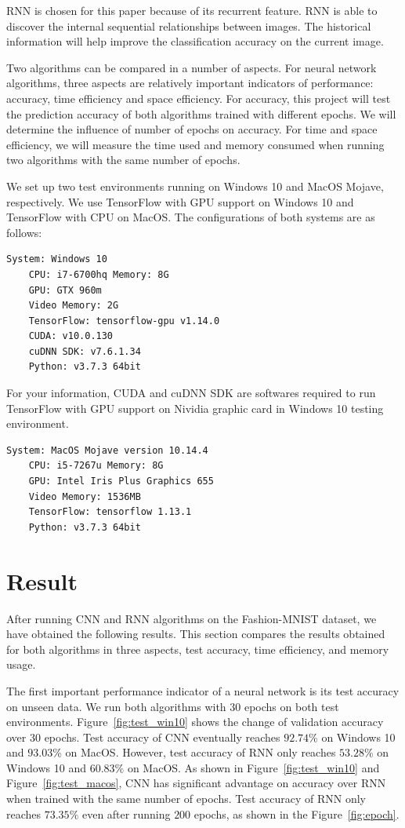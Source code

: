 \documentclass[letterpaper]{article} %
\begin{document}
	RNN is chosen for this paper because of its recurrent feature. RNN is able to discover the internal sequential relationships between images. The historical information will help improve the classification accuracy on the current image.
	
	Two algorithms can be compared in a number of aspects. For neural network algorithms, three aspects are relatively important indicators of performance: accuracy, time efficiency and space efficiency. For accuracy, this project will test the prediction accuracy of both algorithms trained with different epochs. We will determine the influence of number of epochs on accuracy. For time and space efficiency, we will measure the time used and memory consumed when running two algorithms with the same number of epochs.
	
	We set up two test environments running on Windows 10 and MacOS Mojave, respectively. We use TensorFlow with GPU support on Windows 10 and TensorFlow with CPU on MacOS. The configurations of both systems are as follows:
	\begin{lstlisting}[columns=fullflexible, keepspaces=true, stepnumber=1]
	System: Windows 10
	CPU: i7-6700hq Memory: 8G
	GPU: GTX 960m 
	Video Memory: 2G
	TensorFlow: tensorflow-gpu v1.14.0
	CUDA: v10.0.130
	cuDNN SDK: v7.6.1.34
	Python: v3.7.3 64bit
	\end{lstlisting}
	For your information, CUDA and cuDNN SDK are softwares required to run TensorFlow with GPU support on Nividia graphic card in Windows 10 testing environment.
	\begin{lstlisting}[columns=fullflexible, keepspaces=true, stepnumber=1]
	System: MacOS Mojave version 10.14.4
	CPU: i5-7267u Memory: 8G
	GPU: Intel Iris Plus Graphics 655 
	Video Memory: 1536MB
	TensorFlow: tensorflow 1.13.1
	Python: v3.7.3 64bit
	\end{lstlisting}
	
	\section{Result}
	After running CNN and RNN algorithms on the Fashion-MNIST dataset, we have obtained the following results. This section compares the results obtained for both algorithms in three aspects, test accuracy, time efficiency, and memory usage.
	
	The first important performance indicator of a neural network is its test accuracy on unseen data. We run both algorithms with 30 epochs on both test environments. Figure~\ref{fig:test_win10} shows the change of validation accuracy over 30 epochs. Test accuracy of CNN eventually reaches $92.74\%$ on Windows 10 and $93.03\%$ on MacOS.  However, test accuracy of RNN only reaches $53.28\%$ on Windows 10 and $60.83\%$ on MacOS. As shown in Figure~\ref{fig:test_win10} and Figure~\ref{fig:test_macos}, CNN has significant advantage on accuracy over RNN when trained with the same number of epochs. Test accuracy of RNN only reaches $73.35\%$ even after running $200$ epochs, as shown in the Figure~\ref{fig:epoch}.
	
\end{document}
